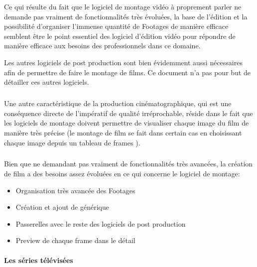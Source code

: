 Ce qui résulte du fait que le logiciel de montage vidéo à proprement
parler ne demande pas vraiment de fonctionnalités très évoluées, la
base de l'édition et la possibilité d'organiser l'immense quantité
de Footages de manière efficace semblent être le point essentiel
des logiciel d'édition vidéo pour répondre de manière efficace aux
besoins des professionnels dans ce domaine.

Les autres logiciels de post production sont bien évidemment aussi
nécessaires afin de permettre de faire le montage de films. Ce document
n'a pas pour but de détailler ces autres logiciels.

\subparagraph{}

Une autre caractéristique de la production cinématographique, qui est
une conséquence directe de l'impératif de qualité irréprochable,
réside dans le fait que les logiciels de montage doivent permettre de
visualiser chaque image du film de manière très précise (le montage
de film se fait dans certain cas en choisissant chaque image depuis un
tableau de frames ).


\subparagraph{}

Bien que ne demandant pas vraiment de fonctionnalités très avancées,
la création de film a des besoins assez évoluées en ce qui concerne
le logiciel de montage:

\begin{itemize} \setlength{\itemsep}{2mm}

  \item{Organisation très avancée des Footages}

  \item{Création et ajout de générique}

  \item{Passerelles avec le reste des logiciels de post production}

  \item{Preview de chaque frame dans le détail}

\end{itemize}


\paragraph {Les séries télévisées}

\paragraph{}

